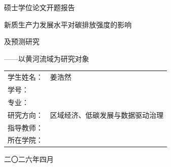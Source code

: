 \documentclass[UTF8,a4paper,zihao=-4,fontset=windows]{ctexart}
\newcommand{\regionscope}{黄河流域}
\newcommand{\blankline}{\underline{\hspace{5.2cm}}}
\begin{document}
\begin{titlepage}
  \centering
  \vspace*{1.2cm}
  {\heiti 硕士学位论文开题报告\par}
  \vspace{1.2cm}
  {\heiti 新质生产力发展水平对碳排放强度的影响\par}
  \vspace{0.2cm}
  {\heiti 及预测研究\par}
  \vspace{0.4cm}
  {\heiti ——以\regionscope 为研究对象\par}
  \vspace{2.2cm}
  \begin{tabular}{>{\heiti}p{3.2cm}p{8cm}}
    学生姓名： & 姜浩然\\[0.45cm]
    学号： & \blankline\\[0.45cm]
    专业： & \blankline\\[0.45cm]
    研究方向： & 区域经济、低碳发展与数据驱动治理\\[0.45cm]
    指导教师： & \blankline\\[0.45cm]
    所在学院： & \blankline\\[0.45cm]
  \end{tabular}
  \vfill
  {二〇二六年四月\par}
\end{titlepage}

\begin{abstract}
新质生产力以科技创新为主导，以数据、知识、人才、绿色技术和现代产业体系为关键支撑，正在成为推动经济高质量发展和绿色低碳转型的重要力量。碳排放强度既体现单位经济产出的碳排放水平，也是衡量区域绿色发展绩效、能源利用效率和“双碳”目标推进质量的重要指标。黄河流域兼具能源资源富集、产业结构偏重、生态环境约束较强和区域发展差异显著等特征，是研究新质生产力赋能降碳减排的重要场景。

本课题拟围绕“新质生产力发展水平是否以及如何影响碳排放强度”展开研究。研究首先构建\regionscope 新质生产力发展水平测度体系，采用熵权法等客观赋权方法测度区域新质生产力指数，并借助核密度估计刻画其动态演变趋势；其次，以碳排放强度为被解释变量，综合使用面板固定效应模型、双重机器学习模型、空间杜宾模型和中介效应模型，检验新质生产力对碳排放强度的直接影响、非线性关系、空间溢出效应及作用机制；最后，结合灰色预测模型、支持向量机和深度学习模型，对碳排放强度变化趋势进行预测分析。预期形成一套兼具测度、解释和预测功能的实证研究框架，为\regionscope 推进新质生产力培育、产业绿色转型和碳排放强度下降提供经验证据与政策建议。

\textbf{关键词：} 新质生产力；碳排放强度；黄河流域；双重机器学习；空间杜宾模型；预测分析
\end{abstract}
\end{document}
